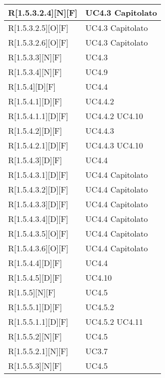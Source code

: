 \begin{longtable}{X | X}
\hline
R[1.5.3.2.4][N][F] & UC4.3 \newline Capitolato \\
\hline
R[1.5.3.2.5][O][F] & UC4.3 \newline Capitolato \\
\hline
R[1.5.3.2.6][O][F] & UC4.3 \newline Capitolato \\
\hline
R[1.5.3.3][N][F] & UC4.3 \\
\hline
R[1.5.3.4][N][F] & UC4.9 \\
\hline
R[1.5.4][D][F] & UC4.4 \\
\hline
R[1.5.4.1][D][F] & UC4.4.2 \\
\hline
R[1.5.4.1.1][D][F] & UC4.4.2 \newline UC4.10 \\
\hline
R[1.5.4.2][D][F] & UC4.4.3 \\
\hline
R[1.5.4.2.1][D][F] & UC4.4.3 \newline UC4.10 \\
\hline
R[1.5.4.3][D][F] & UC4.4 \\
\hline
R[1.5.4.3.1][D][F] & UC4.4 \newline Capitolato \\
\hline
R[1.5.4.3.2][D][F] & UC4.4 \newline Capitolato \\
\hline
R[1.5.4.3.3][D][F] & UC4.4 \newline Capitolato \\
\hline
R[1.5.4.3.4][D][F] & UC4.4 \newline Capitolato \\
\hline
R[1.5.4.3.5][O][F] & UC4.4 \newline Capitolato \\
\hline
R[1.5.4.3.6][O][F] & UC4.4 \newline Capitolato \\
\hline
R[1.5.4.4][D][F] & UC4.4 \\
\hline
R[1.5.4.5][D][F] & UC4.10 \\
\hline
R[1.5.5][N][F] & UC4.5 \\
\hline
R[1.5.5.1][D][F] & UC4.5.2 \\
\hline
R[1.5.5.1.1][D][F] & UC4.5.2 \newline UC4.11 \\
\hline
R[1.5.5.2][N][F] & UC4.5 \\
\hline
R[1.5.5.2.1][N][F] & UC3.7 \\
\hline
R[1.5.5.3][N][F] & UC4.5 \\

\end{longtable}
